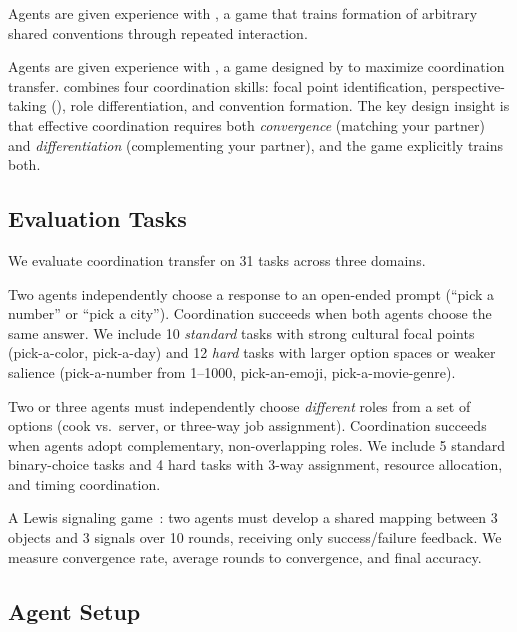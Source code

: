 Agents are given experience with \signalcraft, a game that trains formation of arbitrary shared conventions through repeated interaction.

Agents are given experience with \syncminds, a game designed by \gptfour to maximize coordination transfer.
\syncminds combines four coordination skills: focal point identification, perspective-taking (\tom), role differentiation, and convention formation.
The key design insight is that effective coordination requires both \emph{convergence} (matching your partner) and \emph{differentiation} (complementing your partner), and the game explicitly trains both.

\subsection{Evaluation Tasks}
\label{sec:tasks}

We evaluate coordination transfer on 31 tasks across three domains.

Two agents independently choose a response to an open-ended prompt (\eg ``pick a number'' or ``pick a city'').
Coordination succeeds when both agents choose the same answer.
We include 10 \emph{standard} tasks with strong cultural focal points (\eg pick-a-color, pick-a-day) and 12 \emph{hard} tasks with larger option spaces or weaker salience (\eg pick-a-number from 1--1000, pick-an-emoji, pick-a-movie-genre).

Two or three agents must independently choose \emph{different} roles from a set of options (\eg cook vs.\ server, or three-way job assignment).
Coordination succeeds when agents adopt complementary, non-overlapping roles.
We include 5 standard binary-choice tasks and 4 hard tasks with 3-way assignment, resource allocation, and timing coordination.

A Lewis signaling game~\citep{lipowska2018emergence}: two agents must develop a shared mapping between 3 objects and 3 signals over 10 rounds, receiving only success/failure feedback.
We measure convergence rate, average rounds to convergence, and final accuracy.

\subsection{Agent Setup}
\label{sec:agents}

